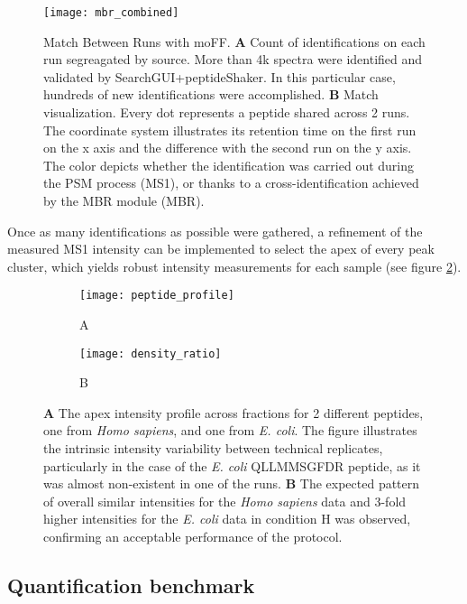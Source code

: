 \begin{figure}[H]
\centering
\texttt{[image: mbr\_combined]}
\caption[Proteome benchmark MBR results]{Match Between Runs with moFF. \textbf{A} Count of identifications on each run segreagated by source. More than 4k spectra were identified and validated by SearchGUI+peptideShaker. In this particular case, hundreds of new identifications were accomplished. \textbf{B} Match visualization. Every dot represents a peptide shared across 2 runs. The coordinate system illustrates its retention time on the first run on the x axis and the difference with the second run on the y axis. The color depicts whether the identification was carried out during the PSM process (MS1), or thanks to a cross-identification achieved by the MBR module (MBR).}
\label{fig:mbr}
\end{figure}

Once as many identifications as possible were gathered, a refinement of the measured MS1 intensity can be implemented to select the apex of every peak cluster, which yields robust intensity measurements for each sample (see figure \ref{fig:apex_intensity}). 

\begin{figure}[H]
\begin{subfigure}{.9\textwidth}
  \centering
    \caption*{A}
\texttt{[image: peptide\_profile]}
\end{subfigure}
\bigskip

\begin{subfigure}{.9\textwidth}
  \centering
    \caption*{B}
\texttt{[image: density\_ratio]}
\end{subfigure}
\caption[Proteome benchmark apex MS1 intensity results]{\textbf{A} The apex intensity profile across fractions for 2 different peptides, one from \textit{Homo sapiens}, and one from \textit{E. coli}. The figure illustrates the intrinsic intensity variability between technical replicates, particularly in the case of the \textit{E. coli} QLLMMSGFDR peptide, as it was almost non-existent in one of the runs. \textbf{B} The expected pattern of overall similar intensities for the \textit{Homo sapiens} data and 3-fold higher intensities for the \textit{E. coli} data in condition H was observed, confirming an acceptable performance of the protocol.}
\label{fig:apex_intensity}
\end{figure}


\subsection{Quantification benchmark}
\label{subsec:quantification}

